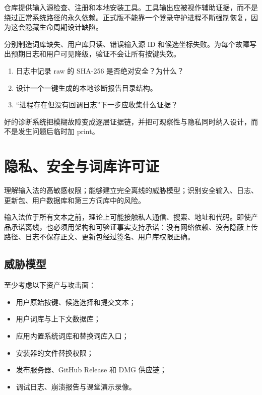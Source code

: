 仓库提供输入源检查、注册和本地安装工具。工具输出应被视作辅助证据，而不是绕过正常系统路径的永久依赖。正式版不能靠一个登录守护进程不断强制恢复，因为这会隐藏生命周期设计缺陷。



\begin{lab}[故障注入]
分别制造词库缺失、用户库只读、错误输入源 ID 和候选坐标失败。为每个故障写出预期日志和用户可见降级，验证不会让所有按键失效。
\end{lab}

\exercises
\begin{enumerate}
  \item 日志中记录 raw 的 SHA-256 是否绝对安全？为什么？
  \item 设计一个一键生成的本地诊断报告目录结构。
  \item “进程存在但没有回调日志”下一步应收集什么证据？
\end{enumerate}

\begin{summarybox}
好的诊断系统把模糊故障变成逐层证据链，并把可观察性与隐私同时纳入设计，而不是发生问题后临时加 print。
\end{summarybox}


\chapter{隐私、安全与词库许可证}

\begin{goals}
理解输入法的高敏感权限；能够建立完全离线的威胁模型；识别安全输入、日志、更新包、用户数据库和第三方词库中的风险。
\end{goals}

输入法位于所有文本之前，理论上可能接触私人通信、搜索、地址和代码。即使产品承诺离线，也必须用架构和可验证事实支持承诺：没有网络依赖、没有隐蔽上传路径、日志不保存正文、更新包经过签名、用户库权限正确。

\section{威胁模型}

至少考虑以下资产与攻击面：

\begin{itemize}
  \item 用户原始按键、候选选择和提交文本；
  \item 用户词库与上下文数据库；
  \item 应用内置系统词库和替换词库入口；
  \item 安装器的文件替换权限；
  \item 发布服务器、GitHub Release 和 DMG 供应链；
  \item 调试日志、崩溃报告与课堂演示录像。
\end{itemize}

